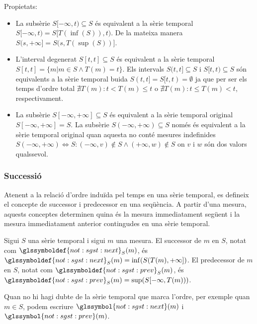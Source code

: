 Propietats:
\begin{itemize}
\item La subsèrie $S[-\infty,t)\subseteq S$ és equivalent a la sèrie
  temporal $S[-\infty,t) = S[T(\inf(S)),t)$. De la mateixa manera
  $S(s,+\infty] = S(s,T(\sup(S))]$.

\item L'interval degenerat $S[t,t]\subseteq S$ és equivalent a la
  sèrie temporal $S[t,t] = \{m | m\in S \wedge T(m)=t \}$. Els intervals
  $S(t,t]\subseteq S$ i $S[t,t)\subseteq S$ són equivalents a la sèrie
  temporal buida $S(t,t] = S[t,t) = \emptyset$ ja que per
  ser els temps d'ordre total $\nexists T(m): t < T(m) \leq t$ o
  $\nexists T(m): t \leq T(m) < t$, respectivament. 

\item La subsèrie $S[-\infty,+\infty] \subseteq S$ és equivalent a la
  sèrie temporal original $S[-\infty,+\infty] = S$. La subsèrie
  $S(-\infty,+\infty) \subseteq S$ només és equivalent a la sèrie
  temporal original quan aquesta no conté mesures indefinides
  $S(-\infty,+\infty) \iff S: (-\infty,v)\notin S \wedge
  (+\infty,w)\notin S$ on $v$ i $w$ són dos valors qualssevol.
\end{itemize}




\subsubsection{Successió}

Atenent a la relació d'ordre induïda pel temps en una sèrie temporal,
es defineix el concepte de successor i predecessor en una seqüència. A
partir d'una mesura, aquests conceptes determinen quina és la mesura
immediatament següent i la mesura immediatament anterior contingudes
en una sèrie temporal.
\begin{definition}\label{def:sgst:seg}\label{def:sgst:ant}
  Sigui $S$ una sèrie temporal i sigui $m$ una mesura. El successor de
  $m$ en $S$, notat com $\glssymboldef{not:sgst:next}_S(m)$, és
  $\glssymboldef{not:sgst:next}_S(m)=\inf(S(T(m),+\infty])$.  El
  predecessor de $m$ en $S$, notat com
  $\glssymboldef{not:sgst:prev}_S(m)$, és
  $\glssymboldef{not:sgst:prev}_S(m)=\sup(S[-\infty,T(m)))$.

  Quan no hi hagi dubte de la sèrie temporal que marca l'ordre, per
  exemple quan $m\in S$, podem escriure
  $\glssymbol{not:sgst:next}(m)$ i $\glssymbol{not:sgst:prev}(m)$.
\end{definition}

